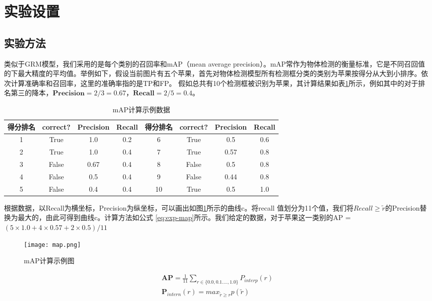 \section{实验设置}

\subsection{实验方法}
类似于GRM模型，我们采用的是每个类别的召回率和mAP（mean average precision）。mAP常作为物体检测的衡量标准，它是不同召回值的下最大精度的平均值。举例如下，假设当前图片有五个苹果，首先对物体检测模型所有检测框分类的类别为苹果按得分从大到小排序。依次计算准确率和召回率，这里的准确率指的是TP和FP。 假如总共有10个检测框被识别为苹果，其计算结果如表\ref{tab:exp-map}所示，例如其中的对于排名第三的降本，$\textbf{Precision} = 2/3 = 0.67$，$\textbf{Recall} = 2/5 = 0.4$。
\begin{table}[htpb]
  \centering
  \caption{mAP计算示例数据}
  \label{tab:exp-map}
  \begin{tabular}{c|c|c|c|c|c|c|c}
    \toprule
    \textbf{得分排名} & \textbf{correct?} & \textbf{Precision} & \textbf{Recall}  & \textbf{得分排名} & \textbf{correct?} & \textbf{Precision} & \textbf{Recall}   \\
    \midrule
    1 & True & 1.0 & 0.2  & 6 & True & 0.5 & 0.6    \\
    \midrule
    2 &  True & 1.0 & 0.4  & 7 & True & 0.57 & 0.8  \\
    \midrule
    3 & False & 0.67 & 0.4  & 8 & False & 0.5 & 0.8  \\
    \midrule
    4 & False & 0.5 & 0.4   & 9 & False & 0.44 & 0.8 \\
    \midrule
    5 & False & 0.4 & 0.4  & 10 & True & 0.5 & 1.0 \\
    \bottomrule
  \end{tabular}
\end{table}
根据数据，以Recall为横坐标，Precision为纵坐标，可以画出如图\ref{fig:exp-map}所示的曲线c。将recall 值划分为11个值，我们将$Recall \geq \widetilde{r}$的Precision替换为最大的，由此可得到曲线c。计算方法如公式
\ref{eq:exp-map}所示。我们给定的数据，对于苹果这一类别的AP = $(5 \times 1.0 + 4 \times 0.57 + 2 \times 0.5)/11$
\begin{figure}[htpb]
	\centering
	\texttt{[image: map.png]}
    \caption{mAP计算示例图}
	\vspace*{-3.5mm}
	\label{fig:exp-map}
\end{figure}
\begin{equation} \label{eq:exp-map}
\begin{split}
    \mathbf{AP} = \frac{1}{11}\sum_{r \in \{0.0,0.1....,1.0\}}P_{interp}(r) \\
    \mathbf{P}_{intern}(r) = max_{\widetilde{r} \geq r}p(\widetilde{r})
\end{split}
\end{equation}

